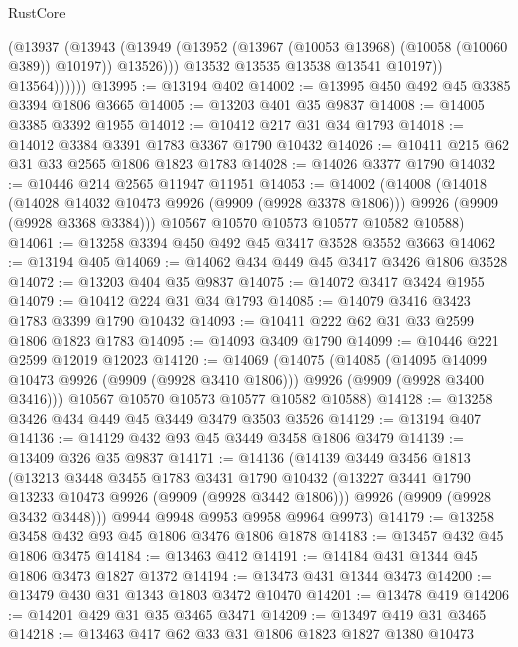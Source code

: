 \begin{lexlean}{RustCore}
\begin{coremodule}
                    (@13937
                      (@13943
                        (@13949
                          (@13952 (@13967 (@10053 @13968) (@10058 (@10060 @389)) @10197))
                          @13526)))
                    @13532
                    @13535
                    @13538
                    @13541
                    @10197))
                @13564))))))
@13995 := @13194 @402
@14002 := @13995 @450 @492 @45 @3385 @3394 @1806 @3665
@14005 := @13203 @401 @35 @9837
@14008 := @14005 @3385 @3392 @1955
@14012 := @10412 @217 @31 @34 @1793
@14018 := @14012 @3384 @3391 @1783 @3367 @1790 @10432
@14026 := @10411 @215 @62 @31 @33 @2565 @1806 @1823 @1783
@14028 := @14026 @3377 @1790
@14032 := @10446 @214 @2565 @11947 @11951
@14053 := @14002
    (@14008
      (@14018
        (@14028 @14032 @10473 @9926 (@9909 (@9928 @3378 @1806)))
        @9926
        (@9909 (@9928 @3368 @3384)))
      @10567
      @10570
      @10573
      @10577
      @10582
      @10588)
@14061 := @13258 @3394 @450 @492 @45 @3417 @3528 @3552 @3663
@14062 := @13194 @405
@14069 := @14062 @434 @449 @45 @3417 @3426 @1806 @3528
@14072 := @13203 @404 @35 @9837
@14075 := @14072 @3417 @3424 @1955
@14079 := @10412 @224 @31 @34 @1793
@14085 := @14079 @3416 @3423 @1783 @3399 @1790 @10432
@14093 := @10411 @222 @62 @31 @33 @2599 @1806 @1823 @1783
@14095 := @14093 @3409 @1790
@14099 := @10446 @221 @2599 @12019 @12023
@14120 := @14069
    (@14075
      (@14085
        (@14095 @14099 @10473 @9926 (@9909 (@9928 @3410 @1806)))
        @9926
        (@9909 (@9928 @3400 @3416)))
      @10567
      @10570
      @10573
      @10577
      @10582
      @10588)
@14128 := @13258 @3426 @434 @449 @45 @3449 @3479 @3503 @3526
@14129 := @13194 @407
@14136 := @14129 @432 @93 @45 @3449 @3458 @1806 @3479
@14139 := @13409 @326 @35 @9837
@14171 := @14136
    (@14139
      @3449
      @3456
      @1813
      (@13213
        @3448
        @3455
        @1783
        @3431
        @1790
        @10432
        (@13227 @3441 @1790 @13233 @10473 @9926 (@9909 (@9928 @3442 @1806)))
        @9926
        (@9909 (@9928 @3432 @3448)))
      @9944
      @9948
      @9953
      @9958
      @9964
      @9973)
@14179 := @13258 @3458 @432 @93 @45 @1806 @3476 @1806 @1878
@14183 := @13457 @432 @45 @1806 @3475
@14184 := @13463 @412
@14191 := @14184 @431 @1344 @45 @1806 @3473 @1827 @1372
@14194 := @13473 @431 @1344 @3473
@14200 := @13479 @430 @31 @1343 @1803 @3472 @10470
@14201 := @13478 @419
@14206 := @14201 @429 @31 @35 @3465 @3471
@14209 := @13497 @419 @31 @3465
@14218 := @13463 @417 @62 @33 @31 @1806 @1823 @1827 @1380 @10473

\end{coremodule}
\end{lexlean}
